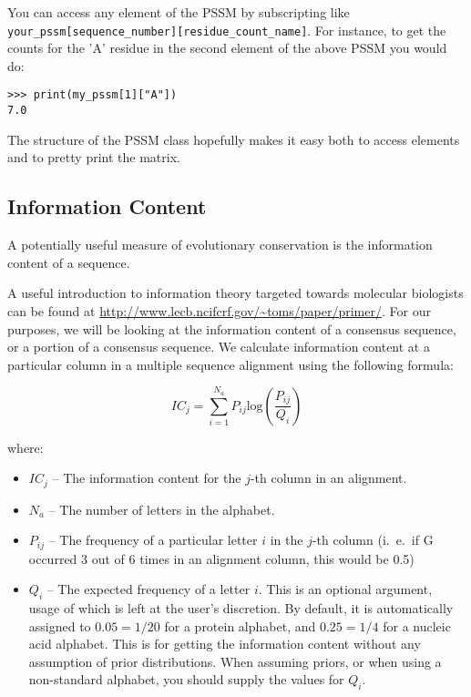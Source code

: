 You can access any element of the PSSM by subscripting like \verb|your_pssm[sequence_number][residue_count_name]|. For instance, to get the counts for the 'A' residue in the second element of the above PSSM you would do:

\begin{verbatim}
>>> print(my_pssm[1]["A"])
7.0
\end{verbatim}

The structure of the PSSM class hopefully makes it easy both to access elements and to pretty print the matrix.

\subsection{Information Content}
\label{sec:getting_info_content}

A potentially useful measure of evolutionary conservation is the information content of a sequence.

A useful introduction to information theory targeted towards molecular biologists can be found at \url{http://www.lecb.ncifcrf.gov/~toms/paper/primer/}. For our purposes, we will be looking at the information content of a consensus sequence, or a portion of a consensus sequence. We calculate information content at a particular column in a multiple sequence alignment using the following formula:

\begin{displaymath}
IC_{j} = \sum_{i=1}^{N_{a}} P_{ij} \mathrm{log}\left(\frac{P_{ij}}{Q_{i}}\right)
\end{displaymath}

\noindent where:

\begin{itemize}
  \item $IC_{j}$ -- The information content for the $j$-th column in an alignment.
  \item $N_{a}$ -- The number of letters in the alphabet.
  \item $P_{ij}$ -- The frequency of a particular letter $i$ in the $j$-th column (i.~e.~if G occurred 3 out of 6 times in an alignment column, this would be 0.5)
  \item $Q_{i}$ --  The expected frequency of a letter $i$. This is an
  optional argument, usage of which is left at the user's
  discretion. By default, it is automatically assigned to $0.05 = 1/20$ for a
  protein alphabet, and $0.25 = 1/4$ for a nucleic acid alphabet. This is for
  getting the information content without any assumption of prior
  distributions. When assuming priors, or when using a non-standard
  alphabet, you should supply the values for $Q_{i}$.
\end{itemize}

